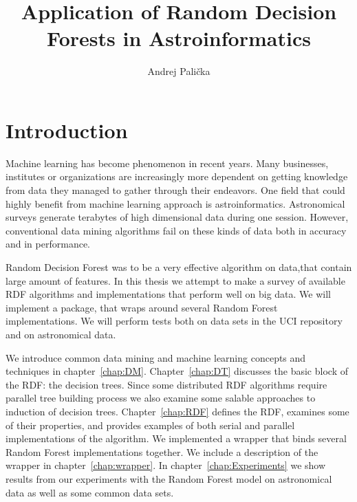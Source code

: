 \documentclass[thesis=B,english]{FITthesis}[2012/10/20]
\title{Application of Random Decision Forests in Astroinformatics}
\author{Andrej Pali{\v c}ka} %
\begin{document}

\chapter{Introduction}
Machine learning has become phenomenon in recent years. Many businesses, institutes or organizations are increasingly more dependent on getting knowledge from data they managed to gather through their endeavors. One field that could highly benefit from machine learning approach is astroinformatics.  Astronomical surveys generate terabytes of high dimensional data during one session. However, conventional data mining algorithms fail on these kinds of data both in accuracy and in performance. 

Random Decision Forest \cite{BR01} was to be a very effective algorithm on data,that contain large amount of features. In this thesis we attempt to make a survey of available RDF algorithms and implementations that perform well on big data. We will implement a package, that wraps around several Random Forest implementations. We will perform tests both on data sets in the UCI repository \cite{uci} and on astronomical data.

We introduce common data mining and machine learning concepts and techniques in chapter~\ref{chap:DM}. Chapter~\ref{chap:DT} discusses the basic block of the RDF: the decision trees. Since some distributed RDF algorithms require parallel tree building process we also examine some salable approaches to induction of decision trees. Chapter~\ref{chap:RDF} defines the RDF, examines some of their properties, and provides examples of both serial and parallel implementations of the algorithm. We implemented a wrapper that binds several Random Forest implementations together. We include a description of the wrapper in chapter~\ref{chap:wrapper}. In chapter~\ref{chap:Experiments} we show results from our experiments with the Random Forest model on astronomical data as well as some common data sets.
\end{document}
